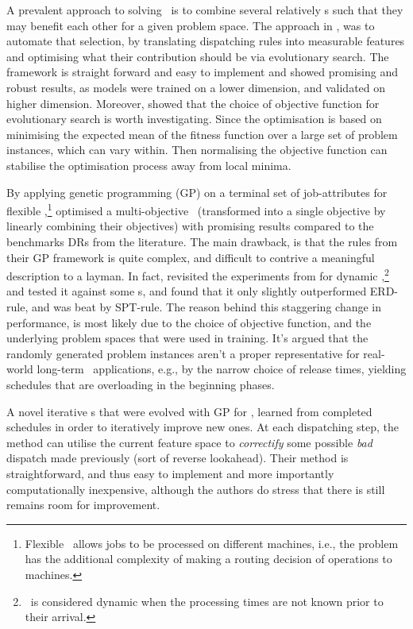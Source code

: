 \documentclass[smallextended]{svjour3}
\begin{document}
A prevalent approach to solving \JSP\ is to combine several relatively \sdr s 
such that they may benefit each other for a given problem space. 
The approach in \cite{InRu14}, was to automate that selection, by 
translating dispatching rules into measurable features and optimising what 
their contribution should be via evolutionary search. The framework is straight 
forward and easy to implement and showed promising and robust results, 
as models were trained on a lower dimension, and validated on higher dimension. 
Moreover, \cite{InRu14} showed that the choice of objective 
function  for evolutionary search is worth investigating. Since the 
optimisation is based on minimising the expected mean of the fitness function 
over a large set of problem instances, which can vary within. Then normalising 
the objective function can stabilise the optimisation process away from local 
minima. 

By applying genetic programming (GP) on a terminal set of job-attributes for 
flexible \jsp,\footnote{Flexible \jsp\ allows jobs to be processed on different 
machines, i.e., the problem has the additional complexity of making a routing 
decision of operations to machines.} \cite{Tay08} optimised a multi-objective 
\jsp~(transformed into a single objective by linearly combining their 
objectives) with promising results 
compared to the benchmarks DRs from the literature.
The main drawback, is that the rules from their GP framework is quite complex, 
and difficult to contrive a meaningful description to a layman.
In fact, \cite{Hildebrandt2010} revisited the experiments from \cite{Tay08} for 
dynamic \jsp,\footnote{\Jsp\ is considered dynamic when the processing times 
are not known prior to their arrival.} and tested it against some \sdr s, and 
found that it only slightly outperformed ERD-rule, and was beat by SPT-rule. 
The reason behind this staggering change in performance, is most likely due to 
the choice of objective function, and the underlying problem spaces that were 
used in training. 
It's argued that the randomly generated problem instances aren't a 
proper representative for real-world long-term \jsp\ applications, e.g., by the 
narrow choice of release times, yielding schedules that are overloading in the 
beginning phases.

A novel iterative \dr s that were evolved with GP for \JSP, \cite{Nguyen13} 
learned from completed schedules in order to iteratively improve new ones. 
At each dispatching step, the method can utilise the current feature space to 
\emph{correctify} some possible \emph{bad} dispatch made previously (sort of 
reverse lookahead). Their method is straightforward, and thus easy to 
implement and more importantly computationally inexpensive, although the 
authors do stress that there is still remains room for improvement.
\end{document}
